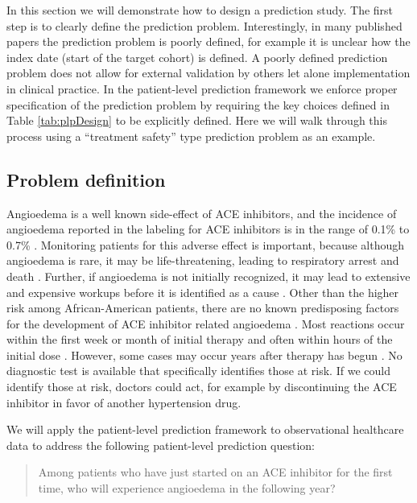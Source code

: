 \documentclass[11pt]{book}
\theoremstyle{definition}
\theoremstyle{definition}
\theoremstyle{definition}
\theoremstyle{remark}
\begin{document}
In this section we will demonstrate how to design a prediction study. The first step is to clearly define the prediction problem. Interestingly, in many published papers the prediction problem is poorly defined, for example it is unclear how the index date (start of the target cohort) is defined. A poorly defined prediction problem does not allow for external validation by others let alone implementation in clinical practice. In the patient-level prediction framework we enforce proper specification of the prediction problem by requiring the key choices defined in Table \ref{tab:plpDesign} to be explicitly defined. Here we will walk through this process using a ``treatment safety'' type prediction problem as an example.

\hypertarget{problem-definition-2}{%
\subsection{Problem definition}\label{problem-definition-2}}

Angioedema is a well known side-effect of ACE inhibitors, and the incidence of angioedema reported in the labeling for ACE inhibitors is in the range of 0.1\% to 0.7\% \citep{byrd_2006}. Monitoring patients for this adverse effect is important, because although angioedema is rare, it may be life-threatening, leading to respiratory arrest and death \citep{norman_2013}. Further, if angioedema is not initially recognized, it may lead to extensive and expensive workups before it is identified as a cause \citep{norman_2013, thompson_1993}. Other than the higher risk among African-American patients, there are no known predisposing factors for the development of ACE inhibitor related angioedema \citep{byrd_2006}. Most reactions occur within the first week or month of initial therapy and often within hours of the initial dose \citep{circardi_2004}. However, some cases may occur years after therapy has begun \citep{mara_1996}. No diagnostic test is available that specifically identifies those at risk. If we could identify those at risk, doctors could act, for example by discontinuing the ACE inhibitor in favor of another hypertension drug.

We will apply the patient-level prediction framework to observational healthcare data to address the following patient-level prediction question:

\begin{quote}
Among patients who have just started on an ACE inhibitor for the first time, who will experience angioedema in the following year?
\end{quote}
\end{document}
